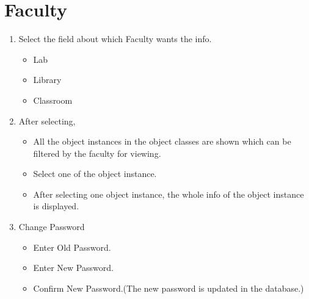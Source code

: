 \documentclass[12pt,a4paper]{article}
\begin{document}
    \newpage
    \section{Faculty}
    \begin{enumerate}
    \item Select the field about which Faculty wants the info.
    \begin{itemize}
    \item Lab
    \item Library
    \item Classroom
    \end{itemize}
    
    \item After selecting, 
    \begin{itemize}
	\item All the object instances in the object classes are shown which can be filtered by the faculty for viewing.
	\item Select one of the object instance. 
	\item After selecting one object instance, the whole info of the object instance is displayed.
    \end{itemize}
    
    \item Change Password
    \begin{itemize}
    \item Enter Old Password.
    \item Enter New Password.
    \item Confirm New Password.(The new password is updated in the database.)
    \end{itemize}
    \end{enumerate}
\end{document}
